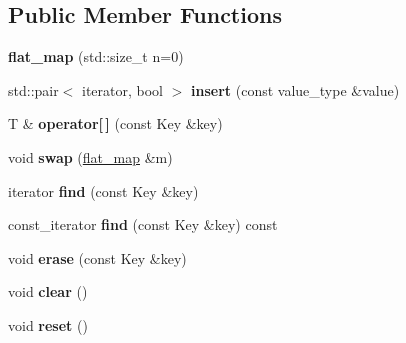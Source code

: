 \subsection*{Public Member Functions}
\begin{DoxyCompactItemize}
\item 
\hypertarget{classflat__map_abd94965cca27bf799dd21e99a224aa78}{{\bfseries flat\+\_\+map} (std\+::size\+\_\+t n=0)}\label{classflat__map_abd94965cca27bf799dd21e99a224aa78}

\item 
\hypertarget{classflat__map_a69b4fb77d523f0667509d272f6176e8a}{std\+::pair$<$ iterator, bool $>$ {\bfseries insert} (const value\+\_\+type \&value)}\label{classflat__map_a69b4fb77d523f0667509d272f6176e8a}

\item 
\hypertarget{classflat__map_af836dd7b5a1c3fabb932ea38fc50fe37}{T \& {\bfseries operator\mbox{[}$\,$\mbox{]}} (const Key \&key)}\label{classflat__map_af836dd7b5a1c3fabb932ea38fc50fe37}

\item 
\hypertarget{classflat__map_aa272d0f4b7e738f18589f1dc7e0e5bca}{void {\bfseries swap} (\hyperlink{classflat__map}{flat\+\_\+map} \&m)}\label{classflat__map_aa272d0f4b7e738f18589f1dc7e0e5bca}

\item 
\hypertarget{classflat__map_a3c10f97ddf0408caafeb34d3a65cc594}{iterator {\bfseries find} (const Key \&key)}\label{classflat__map_a3c10f97ddf0408caafeb34d3a65cc594}

\item 
\hypertarget{classflat__map_a5590f1396408427930a5b8dd400668fb}{const\+\_\+iterator {\bfseries find} (const Key \&key) const }\label{classflat__map_a5590f1396408427930a5b8dd400668fb}

\item 
\hypertarget{classflat__map_a25634923ff2cb3a82351ec2ea7149c5b}{void {\bfseries erase} (const Key \&key)}\label{classflat__map_a25634923ff2cb3a82351ec2ea7149c5b}

\item 
\hypertarget{classflat__map_a9390ff85c2ed502aa78274c1e890eec1}{void {\bfseries clear} ()}\label{classflat__map_a9390ff85c2ed502aa78274c1e890eec1}

\item 
\hypertarget{classflat__map_a152ea87db1ff83c682ac857196d9bc9e}{void {\bfseries reset} ()}\label{classflat__map_a152ea87db1ff83c682ac857196d9bc9e}


\end{DoxyCompactItemize}
